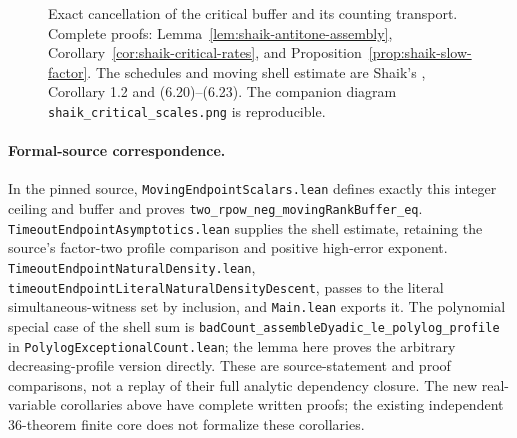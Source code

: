 \documentclass[11pt]{article}
\theoremstyle{remark}\newtheorem{remark}[proposition]{Remark}
\begin{document}
\begin{figure}[ht]
\centering
{}
\caption{Exact cancellation of the critical buffer and its counting
transport. Complete proofs: Lemma~\ref{lem:shaik-antitone-assembly},
Corollary~\ref{cor:shaik-critical-rates}, and
Proposition~\ref{prop:shaik-slow-factor}.
The schedules and moving shell estimate are Shaik's
\cite{Shaik2026v324}, Corollary 1.2 and (6.20)--(6.23).
The companion diagram \texttt{shaik\_critical\_scales.png} is reproducible.}
\end{figure}

\paragraph{Formal-source correspondence.}
In the pinned source, \texttt{MovingEndpointScalars.lean} defines exactly
this integer ceiling and buffer and proves
\texttt{two\_rpow\_neg\_movingRankBuffer\_eq}.
\texttt{TimeoutEndpointAsymptotics.lean} supplies the shell estimate,
retaining the source's factor-two profile comparison and positive
high-error exponent. \texttt{TimeoutEndpointNaturalDensity.lean},
\texttt{timeoutEndpointLiteralNaturalDensityDescent}, passes to the
literal simultaneous-witness set by inclusion, and \texttt{Main.lean}
exports it. The polynomial special case of the shell sum is
\texttt{badCount\_assembleDyadic\_le\_polylog\_profile} in
\texttt{PolylogExceptionalCount.lean}; the lemma here proves the
arbitrary decreasing-profile version directly.
These are source-statement and proof comparisons, not a replay of
their full analytic dependency closure. The new real-variable
corollaries above have complete written proofs; the existing independent
36-theorem finite core does not formalize these corollaries.
\end{document}
